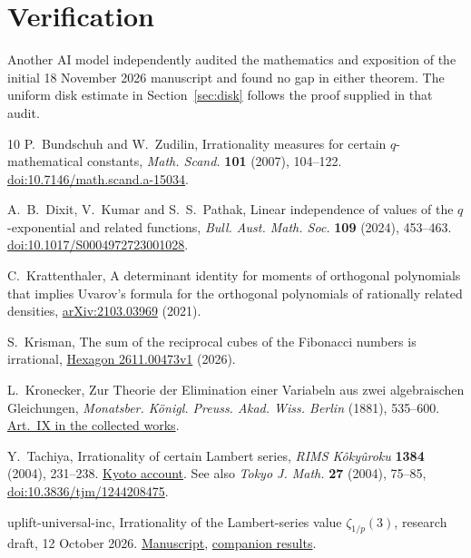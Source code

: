\documentclass[11pt,letterpaper]{article}
\numberwithin{equation}{section}
\begin{document}
\section*{Verification}
Another AI model independently audited the mathematics and exposition of
the initial 18 November 2026 manuscript and found no gap in either
theorem. The uniform disk estimate in Section~\ref{sec:disk} follows
the proof supplied in that audit.

\small
\begin{thebibliography}{10}
\setlength{\itemsep}{1pt}
\setlength{\parskip}{0pt}
P.~Bundschuh and W.~Zudilin,
Irrationality measures for certain \(q\)-mathematical constants,
\emph{Math. Scand.} \textbf{101} (2007), 104--122.
\href{https://doi.org/10.7146/math.scand.a-15034}{doi:10.7146/math.scand.a-15034}.

A.~B.~Dixit, V.~Kumar and S.~S.~Pathak,
Linear independence of values of the \(q\)-exponential and related
functions, \emph{Bull. Aust. Math. Soc.} \textbf{109} (2024), 453--463.
\href{https://doi.org/10.1017/S0004972723001028}{doi:10.1017/S0004972723001028}.

C.~Krattenthaler,
A determinant identity for moments of orthogonal polynomials that
implies Uvarov's formula for the orthogonal polynomials of rationally
related densities, \href{https://arxiv.org/abs/2103.03969}{arXiv:2103.03969}
(2021).

S.~Krisman,
The sum of the reciprocal cubes of the Fibonacci numbers is irrational,
\href{https://hexagonmath.org/2611.00473v1}{Hexagon 2611.00473v1} (2026).

L.~Kronecker, Zur Theorie der Elimination einer Variabeln aus zwei
algebraischen Gleichungen, \emph{Monatsber. K\"onigl. Preuss.
Akad. Wiss. Berlin} (1881), 535--600.
\href{https://www.e-rara.ch/download/pdf/5761162.pdf\#page=42}{Art.~IX in the collected works}.

Y.~Tachiya, Irrationality of certain Lambert series,
\emph{RIMS K\^oky\^uroku} \textbf{1384} (2004), 231--238.
\href{https://www.kurims.kyoto-u.ac.jp/~kyodo/kokyuroku/contents/pdf/1384-34.pdf}{Kyoto account}.
See also \emph{Tokyo J. Math.} \textbf{27} (2004), 75--85,
\href{https://doi.org/10.3836/tjm/1244208475}{doi:10.3836/tjm/1244208475}.

uplift-universal-inc, Irrationality of the Lambert-series value
\(\zeta_{1/p}(3)\), research draft, 12 October 2026.
\href{https://github.com/uplift-universal-inc/qzeta_3-irrationality/blob/main/paper/main.pdf}{Manuscript},
\href{https://github.com/uplift-universal-inc/qzeta_3-irrationality/blob/main/docs/FUTURE_RESULTS.md}{companion results}.


\end{thebibliography}
\end{document}

